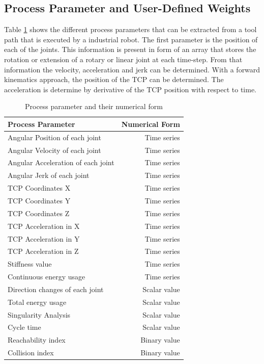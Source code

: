 
\subsection{Process Parameter and User-Defined Weights}\label{pp}

Table \ref{procesparameters} shows the different process parameters that can be extracted from a tool path that is executed by a industrial robot. The first parameter is the position of each of the joints. This information is present in form of an array that stores the rotation or extension of a rotary or linear joint at each time-step. From that information the velocity, acceleration and jerk can be determined. With a forward kinematics approach, the position of the TCP can be determined. The acceleration is determine by derivative of the TCP position with respect to time.


  


\begin{table}[H]
	\centering
	\begin{tabular}{|l|r|}
		Process Parameter & Numerical Form\\
		\hline
		\hline
		\hline
		
		Angular Position of each joint & Time series\\
		Angular Velocity of each joint & Time series\\
		Angular Acceleration of each joint& Time series\\
		Angular Jerk of each joint& Time series\\
		\hline
		\hline	
		
		TCP Coordinates X & Time series\\
		TCP Coordinates Y & Time series\\
		TCP Coordinates Z & Time series\\
		\hline
		\hline
		TCP Acceleration in X & Time series\\
		TCP Acceleration in Y & Time series\\
		TCP Acceleration in Z & Time series\\
		\hline
		\hline
		Stiffness value & Time series\\
		
		
		Continuous energy usage & Time series\\
		\hline
		\hline
		Direction changes of each joint& Scalar value\\
		Total energy usage & Scalar value\\
		Singularity Analysis & Scalar value\\
		Cycle time & Scalar value\\
		\hline
		\hline
		Reachability index & Binary value\\
		Collision index & Binary value\\
		\hline
		\hline
		
	\end{tabular}
	
	
	\caption{Process parameter and their numerical form}
	\label{procesparameters}
\end{table}

